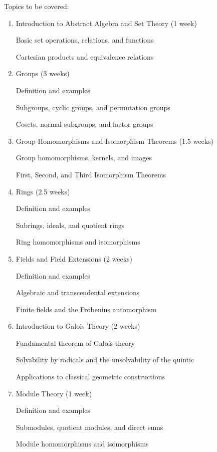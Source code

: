 \documentclass{report}
\begin{document}
Topics to be covered:

\begin{enumerate}

\item  Introduction to Abstract Algebra and Set Theory (1 week)
    
       Basic set operations, relations, and functions

       Cartesian products and equivalence relations

\item   Groups (3 weeks)
    
       Definition and examples

       Subgroups, cyclic groups, and permutation groups

       Cosets, normal subgroups, and factor groups

\item   Group Homomorphisms and Isomorphism Theorems (1.5 weeks)
    
       Group homomorphisms, kernels, and images

       First, Second, and Third Isomorphism Theorems

\item   Rings (2.5 weeks)
    
       Definition and examples

       Subrings, ideals, and quotient rings

       Ring homomorphisms and isomorphisms


\item  Fields and Field Extensions (2 weeks)
    
       Definition and examples

       Algebraic and transcendental extensions

       Finite fields and the Frobenius automorphism

\item  Introduction to Galois Theory (2 weeks)
    
       Fundamental theorem of Galois theory

       Solvability by radicals and the unsolvability of the quintic

       Applications to classical geometric constructions

\item  Module Theory (1 week)
    
       Definition and examples

       Submodules, quotient modules, and direct sums

       Module homomorphisms and isomorphisms

\end{enumerate}
\end{document}
